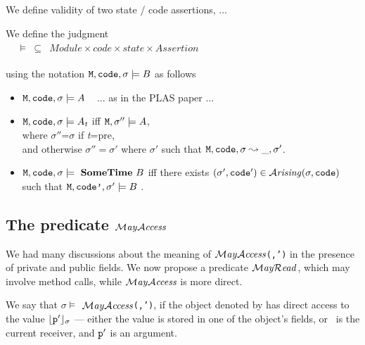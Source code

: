 \documentclass{llncs}
\newcommand{\prg}[1]{{\mbox{\tt{#1}}}}
\begin{document}
 We define validity of two state / code  assertions, ...

\begin{definition}
 We define the judgment \\
$
\begin{array}{c}
\begin{array}{lcllcl}
\ \ \  \models  &   \subseteq &   Module \times code \times state   \times  Assertion 
\end{array}
\end{array}
$

\noindent
using the notation $\Prog{},\prg{code},\sigma\models \B $ as follows
\begin{itemize}
\item
$\Prog{},\prg{code},\sigma\models \syntax{\A}$  \ \hspace{.3in} ... as in the PLAS paper ...
\item
$\Prog{},\prg{code},\sigma\models \syntax{\A}_{\textit{t}}$  
iff   $\Prog{},\sigma''\models \syntax{\A}$, \\
where $\sigma''$=$\sigma$ if {{\textit{t}}}=\textsf{pre}, \\
and otherwise $\sigma''=\sigma'$  where $\sigma'$ such that $\Prog{},\prg{code},\sigma \leadsto \_, \sigma'$.
\item 
$\Prog{},\prg{code},\sigma\models \ {\bf{SomeTime}}\ \syntax{\B} $ iff 
there exists  $(\sigma',\prg{code}')\in \Arising(\sigma,\prg{code})$ such that
$\Prog{},\prg{code'},\sigma'\models   \syntax{\B}$ .

    \end{itemize}

\end{definition}

\subsection{The predicate $\mathcal{M}\textrm{\textit{ay}}{\mathcal{A}}\textrm{\textit{ccess}}$}

We had many discussions about the meaning of \prg{$\mathcal{M}\textrm{\textit{ay}}{\mathcal{A}}\textrm{\textit{ccess}}$(\p,\p')} in the presence of private and public fields. We now propose a predicate $\mathcal{M}\textrm{\textit{ay}}{\mathcal{R}}\textrm{\textit{ead}}$, which may involve method calls, while $\mathcal{M}\textrm{\textit{ay}}{\mathcal{A}}\textrm{\textit{ccess}}$ is more direct.
 
We say that $\sigma \models$ \prg{$\mathcal{M}\textrm{\textit{ay}}{\mathcal{A}}\textrm{\textit{ccess}}$(\p,\p')}, if the object denoted by \interp{\p}{\sigma} has direct access to the   value
$\interp{\p'}{\sigma}$ --- either the value is stored in one of the object's fields, or \p\ is the current receiver, and $\p'$ is an argument.
\end{document}
